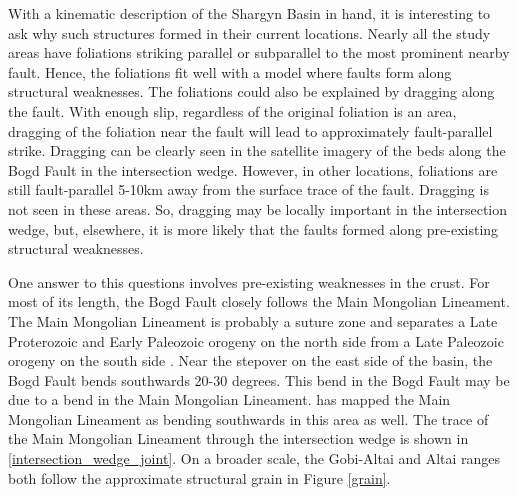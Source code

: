 	With a kinematic description of the Shargyn Basin in hand, it is interesting to ask why such structures formed in their current locations. Nearly all the study areas have foliations striking parallel or subparallel to the most prominent nearby fault. Hence, the foliations fit well with a model where faults form along structural weaknesses. The foliations could also be explained by dragging along the fault. With enough slip, regardless of the original foliation is an area, dragging of the foliation near the fault will lead to approximately fault-parallel strike. Dragging can be clearly seen in the satellite imagery of the beds along the Bogd Fault in the intersection wedge. However, in other locations, foliations are still fault-parallel 5-10km away from the surface trace of the fault. Dragging is not seen in these areas. So, dragging may be locally important in the intersection wedge, but, elsewhere, it is more likely that the faults formed along pre-existing structural weaknesses. 

        One answer to this questions involves pre-existing weaknesses in the crust. For most of its length, the Bogd Fault closely follows the Main Mongolian Lineament. The Main Mongolian Lineament is probably a suture zone and separates a Late Proterozoic and Early Paleozoic orogeny on the north side from a Late Paleozoic orogeny on the south side \citep{Windley2007}. Near the stepover on the east side of the basin, the Bogd Fault bends southwards 20-30 degrees. This bend in the Bogd Fault may be due to a bend in the Main Mongolian Lineament. \citet{Windley2007} has mapped the Main Mongolian Lineament as bending southwards in this area as well. The trace of the Main Mongolian Lineament through the intersection wedge is shown in \ref{intersection_wedge_joint}. On a broader scale, the Gobi-Altai and Altai ranges both follow the approximate structural grain in Figure \ref{grain}.
	
